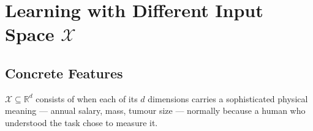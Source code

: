 \section{Learning with Different Input Space
\texorpdfstring{\(\mathcal{X}\)}{X}}\label{sec:inspace}


\subsection{Concrete Features}

\begin{definition}\label{def:concrete}
    \(\mathcal{X} \subseteq \mathbb{R}^d\) consists of 
    when each of its \(d\) dimensions carries a sophisticated physical meaning
    --- annual salary, mass, tumour size --- normally because a human who
    understood the task chose to measure it.
\end{definition}

